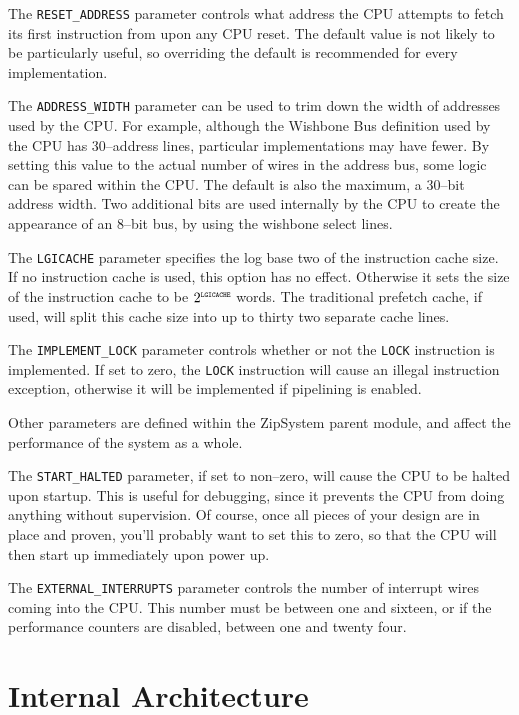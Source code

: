 \documentclass{gqtekspec}
\begin{document}
The {\tt RESET\_ADDRESS} parameter controls what address the CPU attempts to
fetch its first instruction from upon any CPU reset.  The default value is
not likely to be particularly useful, so overriding the default is recommended
for every implementation.

The {\tt ADDRESS\_WIDTH} parameter can be used to trim down the width of
addresses used by the CPU.  For example, although the Wishbone Bus definition
used by the CPU  has 30--address lines, particular implementations may have
fewer.  By setting this value to the actual number of wires in the address
bus, some logic can be spared within the CPU.  The default is also the maximum,
a 30--bit address width.  Two additional bits are used internally by the CPU
to create the appearance of an 8--bit bus, by using the wishbone select lines.

The {\tt LGICACHE} parameter specifies the log base two of the instruction
cache size.  If no instruction cache is used, this option has no effect. 
Otherwise it sets the size of the instruction cache to be
$2^{\mbox{\tiny\tt LGICACHE}}$ words.  The traditional prefetch cache, if used,
will split this cache size into up to thirty two separate cache lines.

The {\tt IMPLEMENT\_LOCK} parameter controls whether or not the {\tt LOCK}
instruction is implemented.  If set to zero, the {\tt LOCK} instruction will
cause an illegal instruction exception, otherwise it will be implemented if
pipelining is enabled.

Other parameters are defined within the ZipSystem parent module, and affect
the performance of the system as a whole.

The {\tt START\_HALTED} parameter, if set to non--zero, will cause the 
CPU to be halted upon startup.  This is useful for debugging, since it prevents
the CPU from doing anything without supervision.  Of course, once all pieces
of your design are in place and proven, you'll probably want to set this to
zero, so that the CPU will then start up immediately upon power up.

The {\tt EXTERNAL\_INTERRUPTS} parameter controls the number of interrupt
wires coming into the CPU.  This number must be between one and sixteen,
or if the performance counters are disabled, between one and twenty four.

\section{Internal Architecture}\label{sec:internals}
\end{document}
